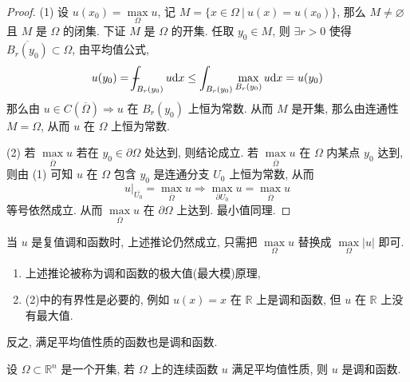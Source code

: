 \documentclass[11pt]{ctexart}[UTF8]
\begin{document}
\begin{proof}
    (1) 设 $u(x_0) = \max\limits_{\Omega} u$, 记 $M = \{ x \in \Omega\ |\ u(x) = u(x_0) \}$, 那么 $M \neq \varnothing$ 且 $M$ 是 $\Omega$ 的闭集. 下证 $M$ 是 $\Omega$ 的开集. 
    任取 $y_{0} \in M$, 则 $\exists r > 0$ 使得 $\overline{B_{r}(y_{0})} \subset \Omega$, 由平均值公式,
    \begin{equation*}
        u(y_{0}) = \averageint_{B_{r}(y_{0})} u \mathrm{d}x \leq \int_{B_{r}(y_{0})} \max\limits_{B_{r}(y_{0})} u \mathrm{d}x = u(y_{0})
    \end{equation*}
    那么由 $u \in C(\overline{\Omega}) \Longrightarrow u$ 在 $B_{r}(y_{0})$ 上恒为常数. 从而 $M$ 是开集, 那么由连通性 $M = \Omega$, 从而 $u$ 在 $\Omega$ 上恒为常数.\par
    (2) 若 $\max\limits_{\overline{\Omega}} u $ 若在 $y_{0} \in \partial\Omega$ 处达到, 则结论成立. 若 $\max\limits_{\overline{\Omega}} u $ 在 $\Omega$ 内某点 $y_0$ 达到, 则由 (1) 可知 $u$ 在
    $\Omega$ 包含 $y_{0}$ 是连通分支 $U_{0}$ 上恒为常数, 从而
    \begin{equation*}
        u\big|_{\overline{U_{0}}} = \max\limits_{\overline{\Omega}} u \Longrightarrow \max\limits_{\partial U_{0}} u = \max\limits_{\overline{\Omega}} u
    \end{equation*}
    等号依然成立. 从而 $\max\limits_{\overline{\Omega}} u$ 在 $\partial\Omega$ 上达到. 最小值同理.
\end{proof}
\begin{remark}
    当 $u$ 是复值调和函数时, 上述推论仍然成立, 只需把 $\max\limits_{\Omega} u$ 替换成 $\max\limits_{\Omega} |u|$ 即可.
    \begin{enumerate}
        \item 上述推论被称为调和函数的极大值(最大模)原理,
        \item (2)中的有界性是必要的, 例如 $u(x) = x$ 在 $\mathbb{R}$ 上是调和函数, 但 $u$ 在 $\mathbb{R}$ 上没有最大值.
    \end{enumerate}
\end{remark}
反之, 满足平均值性质的函数也是调和函数.
\begin{theorem}
    设 $\Omega \subset \mathbb{R}^n$ 是一个开集, 若 $\Omega$ 上的连续函数 $u$ 满足平均值性质, 则 $u$ 是调和函数.
\end{theorem}
\end{document}
